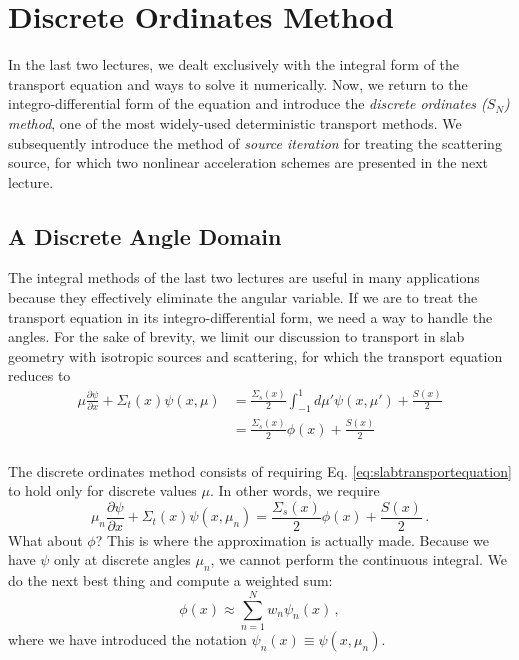 \chapter{Discrete Ordinates Method}
\label{lec:discreteordinates}

In the last two lectures, we dealt exclusively with the integral form of the 
transport equation and ways to solve it numerically.  Now, we return to the 
integro-differential form of the equation and introduce the \textit{discrete 
ordinates ($S_N$) method}, one of the most widely-used deterministic transport 
methods.  We subsequently introduce the method of \textit{source iteration} for 
treating the scattering source, for which two nonlinear acceleration 
schemes are presented in the next lecture.

\section*{A Discrete Angle Domain}

The integral methods of the last two lectures are useful in many applications because they effectively eliminate the angular variable.  If we are to treat the transport equation in its integro-differential form, we need a way to handle the angles.  For the sake of brevity, we limit our discussion to transport in slab geometry with isotropic sources and scattering, for which the transport equation reduces to
\begin{equation}
\begin{split}
 \mu \frac{\partial \psi}{\partial x} + \Sigma_t(x)\psi(x,\mu) &= \frac{\Sigma_s(x)}{2}\int^1_{-1}d\mu' \psi(x,\mu') + \frac{S(x)}{2} \\
                                                               &= \frac{\Sigma_s(x)}{2}\phi(x) + \frac{S(x)}{2} \\
\end{split}
 \label{eq:slabtransportequation}
\end{equation}

The discrete ordinates method consists of requiring Eq. \ref{eq:slabtransportequation} to hold only for discrete values $\mu$.  In other words, we require
\begin{equation}
 \mu_n \frac{\partial \psi}{\partial x} + \Sigma_t(x)\psi(x,\mu_n) = \frac{\Sigma_s(x)}{2} \phi(x) + \frac{S(x)}{2} \, .
 \label{eq:snequation}
\end{equation}
What about $\phi$?  This is where the approximation is actually made.  Because we have $\psi$ only at discrete angles $\mu_n$, we cannot perform the continuous integral.  We do the next best thing and compute a weighted sum:
\begin{equation}
 \phi(x) \approx \sum^N_{n=1} w_n  \psi_n(x) \, ,
 \label{eq:phiquad}
\end{equation}
where we have introduced the notation $\psi_n(x) \equiv \psi(x,\mu_n)$.  

